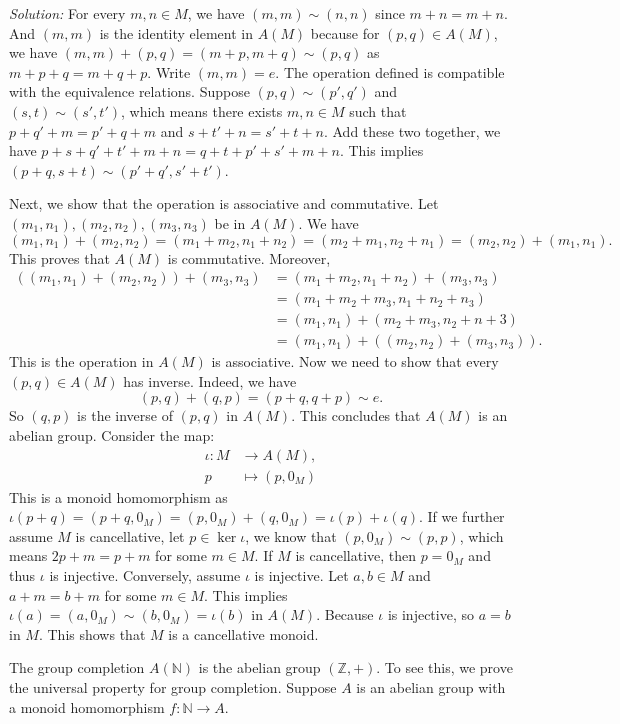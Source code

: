\documentclass[a4paper, 11pt]{article}
\newenvironment{solution}
    {\textit{Solution:}}
    {}
\begin{document}
\begin{solution}
For every \(m,n\in M\), we have \((m,m)\sim (n,n)\) since \(m+n=m+n\). And \((m,m)\) is the identity element in \(A(M)\) because for \((p,q)\in A(M)\), we have 
\((m,m)+(p,q)=(m+p,m+q)\sim (p,q)\) as \(m+p+q=m+q+p\). Write \((m,m)=e\). The operation defined is compatible with the equivalence relations. Suppose \((p,q)\sim (p',q')\) and 
\((s,t)\sim (s',t')\), which means there exists \(m,n\in M\) such that \(p+q'+m=p'+q+m\) and \(s+t'+n=s'+t+n\). Add these two together, we have \(p+s+q'+t'+m+n=q+t+p'+s'+m+n\). This implies 
\((p+q,s+t)\sim (p'+q',s'+t')\).
\par 
Next, we show that the operation is associative and commutative. Let \((m_1,n_1),(m_2,n_2),(m_3,n_3)\) be in \(A(M)\). We have 
$$(m_1,n_1)+(m_2,n_2)=(m_1+m_2,n_1+n_2)=(m_2+m_1,n_2+n_1)=(m_2,n_2)+(m_1,n_1).$$
This proves that \(A(M)\) is commutative. Moreover, 
$$\begin{align*}
    ((m_1,n_1)+(m_2,n_2))+(m_3,n_3) & = (m_1+m_2,n_1+n_2)+(m_3,n_3)\\ 
                                    & = (m_1+m_2+m_3,n_1+n_2+n_3)\\ 
                                    & = (m_1,n_1)+(m_2+m_3,n_2+n+3)\\ 
                                    & = (m_1,n_1)+((m_2,n_2)+(m_3,n_3)).
\end{align*}$$ 
This is the operation in \(A(M)\) is associative. Now we need to show that every \((p,q)\in A(M)\) has inverse. Indeed, we have 
$$(p,q)+(q,p)=(p+q,q+p)\sim e.$$
So \((q,p)\) is the inverse of \((p,q)\) in \(A(M)\). This concludes that \(A(M)\) is an abelian group. Consider the map:
$$\begin{align*}
    \iota:M &\rightarrow A(M),\\ 
          p &\mapsto (p,0_M)
\end{align*}$$
This is a monoid homomorphism as \(\iota(p+q)=(p+q,0_M)=(p,0_M)+(q,0_M)=\iota(p)+\iota(q)\). If we further assume \(M\) is cancellative, let \(p\in \ker \iota\), we know that 
\((p,0_M)\sim (p,p)\), which means \(2p+m=p+m\) for some \(m\in M\). If \(M\) is cancellative, then \(p=0_M\) and thus \(\iota\) is injective. Conversely, assume \(\iota\) is injective. Let 
\(a,b\in M\) and \(a+m=b+m\) for some \(m\in M\). This implies \(\iota(a)=(a,0_M)\sim (b,0_M)=\iota(b)\) in \(A(M)\). Because \(\iota\) is injective, so \(a=b\) in \(M\). This shows that \(M\) is a 
cancellative monoid.
\par
The group completion \(A(\mathbb{N})\) is the abelian group \((\mathbb{Z},+)\). To see this, we prove the universal property for group completion. Suppose \(A\) is an abelian group with a monoid homomorphism \(f:\mathbb{N}\rightarrow A\). 

\end{solution}
\end{document}
